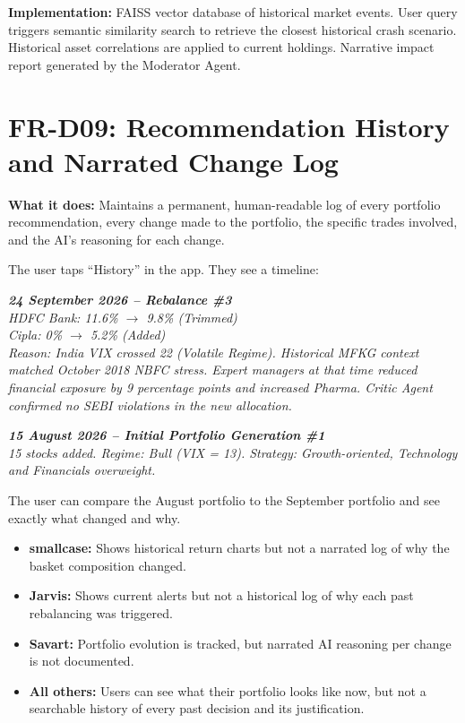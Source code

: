 \documentclass[12pt, a4paper, openany, oneside]{report}
\begin{document}
\textbf{Implementation:} FAISS vector database of historical market events. User query triggers semantic similarity search to retrieve the closest historical crash scenario. Historical asset correlations are applied to current holdings. Narrative impact report generated by the Moderator Agent.

\section{FR-D09: Recommendation History and Narrated Change Log}

\textbf{What it does:} Maintains a permanent, human-readable log of every portfolio recommendation, every change made to the portfolio, the specific trades involved, and the AI's reasoning for each change.

\begin{examplebox}
The user taps ``History'' in the app. They see a timeline:

\textit{\textbf{24 September 2026 -- Rebalance \#3}}\\
\textit{HDFC Bank: 11.6\% $\rightarrow$ 9.8\% (Trimmed)}\\
\textit{Cipla: 0\% $\rightarrow$ 5.2\% (Added)}\\
\textit{Reason: India VIX crossed 22 (Volatile Regime). Historical MFKG context matched October 2018 NBFC stress. Expert managers at that time reduced financial exposure by 9 percentage points and increased Pharma. Critic Agent confirmed no SEBI violations in the new allocation.}

\textit{\textbf{15 August 2026 -- Initial Portfolio Generation \#1}}\\
\textit{15 stocks added. Regime: Bull (VIX = 13). Strategy: Growth-oriented, Technology and Financials overweight.}

The user can compare the August portfolio to the September portfolio and see exactly what changed and why.
\end{examplebox}

\begin{gapbox}
\begin{itemize}[noitemsep]
  \item \textbf{smallcase:} Shows historical return charts but not a narrated log of why the basket composition changed.
  \item \textbf{Jarvis:} Shows current alerts but not a historical log of why each past rebalancing was triggered.
  \item \textbf{Savart:} Portfolio evolution is tracked, but narrated AI reasoning per change is not documented.
  \item \textbf{All others:} Users can see what their portfolio looks like now, but not a searchable history of every past decision and its justification.
\end{itemize}
\end{gapbox}
\end{document}

